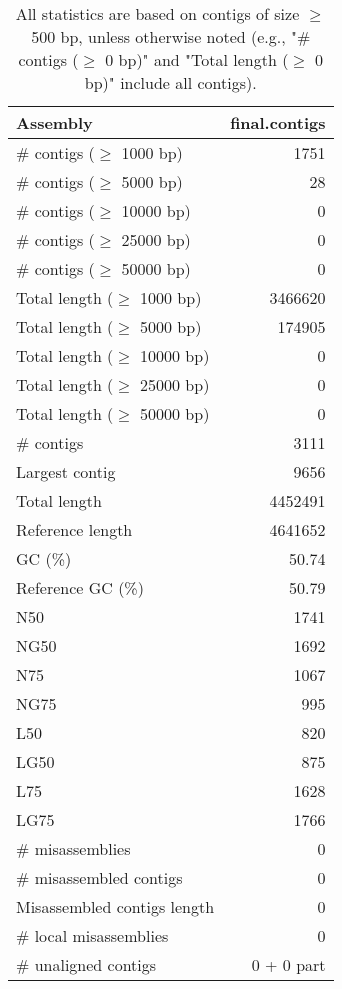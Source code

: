 \documentclass[12pt,a4paper]{article}
\begin{document}
\begin{table}[ht]
\begin{center}
\caption{All statistics are based on contigs of size $\geq$ 500 bp, unless otherwise noted (e.g., "\# contigs ($\geq$ 0 bp)" and "Total length ($\geq$ 0 bp)" include all contigs).}
\begin{tabular}{|l*{1}{|r}|}
\hline
Assembly & final.contigs \\ \hline
\# contigs ($\geq$ 1000 bp) & 1751 \\ \hline
\# contigs ($\geq$ 5000 bp) & 28 \\ \hline
\# contigs ($\geq$ 10000 bp) & 0 \\ \hline
\# contigs ($\geq$ 25000 bp) & 0 \\ \hline
\# contigs ($\geq$ 50000 bp) & 0 \\ \hline
Total length ($\geq$ 1000 bp) & 3466620 \\ \hline
Total length ($\geq$ 5000 bp) & 174905 \\ \hline
Total length ($\geq$ 10000 bp) & 0 \\ \hline
Total length ($\geq$ 25000 bp) & 0 \\ \hline
Total length ($\geq$ 50000 bp) & 0 \\ \hline
\# contigs & 3111 \\ \hline
Largest contig & 9656 \\ \hline
Total length & 4452491 \\ \hline
Reference length & 4641652 \\ \hline
GC (\%) & 50.74 \\ \hline
Reference GC (\%) & 50.79 \\ \hline
N50 & 1741 \\ \hline
NG50 & 1692 \\ \hline
N75 & 1067 \\ \hline
NG75 & 995 \\ \hline
L50 & 820 \\ \hline
LG50 & 875 \\ \hline
L75 & 1628 \\ \hline
LG75 & 1766 \\ \hline
\# misassemblies & 0 \\ \hline
\# misassembled contigs & 0 \\ \hline
Misassembled contigs length & 0 \\ \hline
\# local misassemblies & 0 \\ \hline
\# unaligned contigs & 0 + 0 part \\ \hline

\end{tabular}
\end{center}
\end{table}
\end{document}
